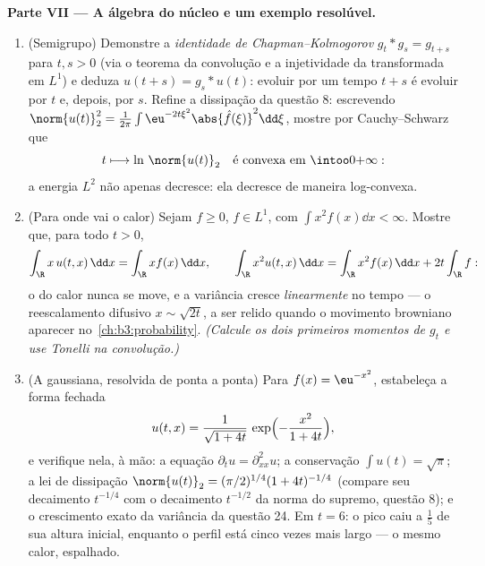 \begin{problem}[{Problema de fim de semana --- $\partial_tu =
\partial^2_{xx}u$, resolvida de
ponta a ponta}]
\medskip
\noindent\textbf{Parte VII --- A álgebra do núcleo e um exemplo
resolúvel.}
\begin{enumerate}[resume]
  \item (Semigrupo) Demonstre a \emph{identidade de
        Chapman--Kolmogorov} $g_t * g_s = g_{t+s}$ para $t, s > 0$ (via o teorema da
        convolução e a injetividade da transformada em $L^1$) e
        deduza $u(t + s) = g_s *
        u(t)$: evoluir por um tempo $t + s$ é evoluir por
        $t$ e, depois, por $s$. Refine a dissipação da questão 8:
        escrevendo $\norm{u(t)}_2^2 = \frac1{2\pi}\int
        \eu^{-2t\xi^2}\abs{\hat f(\xi)}^2\dd\xi$, mostre por Cauchy--Schwarz que
        \[
        t \longmapsto \ln\,\norm{u(t)}_2
        \quad\text{é convexa em } \intoo0{+\infty} :
        \]
        a energia $L^2$ não apenas decresce: ela decresce de maneira
        log-convexa.
  \item (Para onde vai o calor) Sejam $f \geq 0$, $f \in L^1$, com $\int x^2f(x)\dd x < \infty$. Mostre que,
        para todo $t > 0$,
        \[
        \int_\R x\,u(t, x)\,\dd x = \int_\R x f(x)\,\dd x,
        \qquad
        \int_\R x^2u(t, x)\,\dd x
        = \int_\R x^2f(x)\,\dd x + 2t\int_\R f :
        \]
        o  do calor nunca se move, e a variância cresce
        \emph{linearmente} no tempo --- o reescalamento difusivo $x \sim \sqrt{2t}$, a
        ser relido quando o movimento browniano aparecer no~\cref{ch:b3:probability}. \emph{(Calcule os dois primeiros momentos de
        $g_t$ e use Tonelli na convolução.)}
  \item (A gaussiana, resolvida de ponta a ponta) Para $f(x) =
        \eu^{-x^2}$, estabeleça
        a forma fechada
        \[
        u(t, x) = \frac1{\sqrt{1 + 4t}}\,
        \exp\Bigl(-\frac{x^2}{1 + 4t}\Bigr),
        \]
        e verifique nela, à mão: a equação $\partial_tu
        = \partial^2_{xx}u$; a conservação $\int u(t) =
        \sqrt\pi$; a
        lei de dissipação $\norm{u(t)}_2 =
        (\pi/2)^{1/4}(1 + 4t)^{-1/4}$ (compare seu decaimento $t^{-1/4}$ com o
        decaimento $t^{-1/2}$ da norma do supremo, questão 8); e o
        crescimento exato da variância da questão 24. Em $t = 6$: o
        pico caiu a $\frac15$ de sua altura inicial, enquanto o perfil está
        cinco vezes mais largo --- o mesmo calor, espalhado.
\end{enumerate}
\end{problem}
